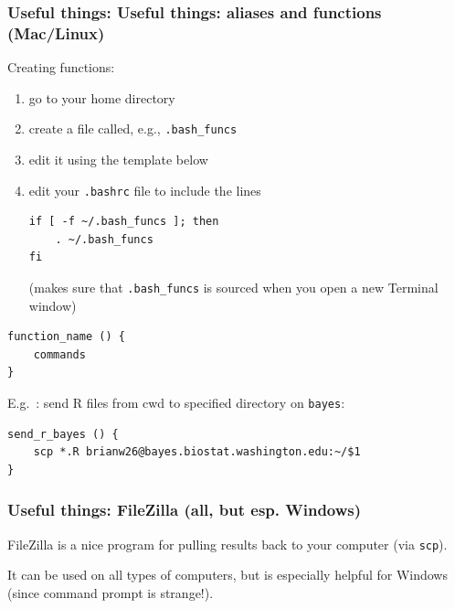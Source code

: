 \documentclass[12pt, 
hyperref={colorlinks=true, linkcolor=BlueViolet, urlcolor=BlueViolet},dvipsnames]{beamer}
\begin{document}
\begin{frame}[fragile]
\frametitle{Useful things: Useful things: aliases and functions (Mac/Linux)}
Creating functions: \vspace{-0.3cm} 
\begin{enumerate}
\item go to your home directory
\item create a file called, e.g., \texttt{.bash\_funcs}
\item edit it using the template below
\item edit your \texttt{.bashrc} file to include the lines \vspace{-0.1cm}
{\scriptsize
\begin{verbatim}
if [ -f ~/.bash_funcs ]; then
    . ~/.bash_funcs
fi
\end{verbatim}
}
(makes sure that \texttt{.bash\_funcs} is sourced when you open a new Terminal window)
\end{enumerate} \vspace{-0.3cm}
{\scriptsize
\begin{verbatim}
function_name () {
    commands
}
\end{verbatim}
}

E.g.~: send R files from cwd to specified directory on \texttt{bayes}: \vspace{-0.3cm}
{\scriptsize
\begin{verbatim}
send_r_bayes () {
    scp *.R brianw26@bayes.biostat.washington.edu:~/$1
}
\end{verbatim}
}
\end{frame}

\begin{frame}
\frametitle{Useful things: FileZilla (all, but esp. Windows)}
FileZilla is a nice program for pulling results back to your computer (via \texttt{scp}). 

It can be used on all types of computers, but is especially helpful for Windows (since command prompt is strange!).
\end{frame}
\end{document}
